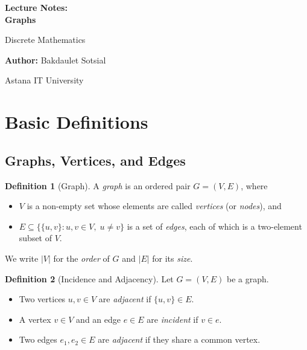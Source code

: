 \documentclass[12pt,a4paper]{article}
\theoremstyle{definition}
\newtheorem{definition}{Definition}[section]
\theoremstyle{plain}
\begin{document}
\begin{titlepage}
    \centering
    \vspace*{4cm}
    
    {\Huge\bfseries Lecture Notes:\\ Graphs\par}
    \vspace{1cm}
    {\Large Discrete Mathematics\par}
    \vspace{2cm}
    {\large \textbf{Author:} Bakdaulet Sotsial\par}
    \vspace{1cm}
    
    \vfill
    {\small Astana IT University \par}
    \vspace*{2cm}
\end{titlepage}

\tableofcontents
\newpage
{}

\section{Basic Definitions}
\label{sec:basic-defs}

\subsection{Graphs, Vertices, and Edges}

\begin{definition}[Graph]\label{def:graph}
  A \emph{graph} is an ordered pair \(G = (V, E)\), where
  \begin{itemize}
    \item \(V\) is a non-empty set whose elements are called \emph{vertices}
          (or \emph{nodes}), and
    \item \(E \subseteq \bigl\{\{u,v\} : u, v \in V,\; u \neq v\bigr\}\) is a
          set of \emph{edges}, each of which is a two-element subset of \(V\).
  \end{itemize}
  We write \(|V|\) for the \emph{order} of \(G\) and \(|E|\) for its
  \emph{size}.
\end{definition}

\begin{definition}[Incidence and Adjacency]\label{def:incidence}
  Let \(G = (V,E)\) be a graph.
  \begin{itemize}
    \item Two vertices \(u, v \in V\) are \emph{adjacent} if \(\{u,v\} \in E\).
    \item A vertex \(v \in V\) and an edge \(e \in E\) are \emph{incident} if
          \(v \in e\).
    \item Two edges \(e_1, e_2 \in E\) are \emph{adjacent} if they share a
          common vertex.
  \end{itemize}
\end{definition}
\end{document}

